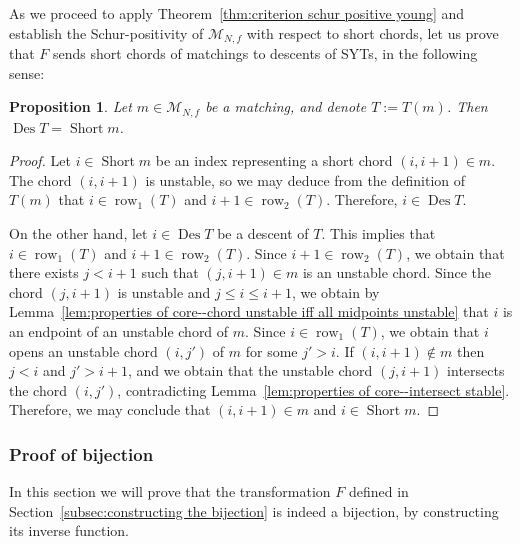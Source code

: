 \documentclass[11pt]{article}
\newtheorem{proposition}[theo]{Proposition}
\theoremstyle{definition}
\numberwithin{equation}{section}
\newcommand{\Des}{\operatorname{Des}}
\newcommand{\Short}{\operatorname{Short}}
\newcommand{\row}{\operatorname{row}}
\newcommand{\M}{\mathcal{M}}
\begin{document}
As we proceed to apply Theorem~\ref{thm:criterion schur positive young} and establish the Schur-positivity of $\M_{N,f}$ with respect to short chords, let us prove that $F$ sends short chords of matchings to descents of SYTs, in the following sense:

\begin{proposition}
\label{prop:F statistic preserving}
    Let $m \in \M_{N,f}$ be a matching, and denote $T := T(m)$. Then $\Des T = \Short m$.
\end{proposition}
\begin{proof}
    Let $i \in \Short m$ be an index representing a short chord $(i,i+1) \in m$. The chord $(i,i+1)$ is unstable, so we may deduce from the definition of $T(m)$ that $i \in \row_1(T)$ and $i+1 \in \row_2(T)$. Therefore, $i \in \Des T$.
    
    On the other hand, let $i \in \Des T$ be a descent of $T$. This implies that $i \in \row_1(T)$ and $i+1 \in \row_2(T)$. Since $i+1 \in \row_2(T)$, we obtain that there exists $j < i+1$ such that $(j,i+1) \in m$ is an unstable chord. Since the chord $(j,i+1)$ is unstable and $j \le i \le i+1$, we obtain by Lemma~\ref{lem:properties of core--chord unstable iff all midpoints unstable} that $i$ is an endpoint of an unstable chord of $m$. Since $i \in \row_1(T)$, we obtain that $i$ opens an unstable chord $(i,j')$ of $m$ for some $j'>i$.
    If $(i,i+1) \notin m$ then $j<i$ and $j' > i+1$, and we obtain that the unstable chord $(j,i+1)$ intersects the chord $(i,j')$, contradicting Lemma~\ref{lem:properties of core--intersect stable}. Therefore, we may conclude that $(i,i+1) \in m$ and $i \in \Short m$.
\end{proof}




\subsubsection{Proof of bijection}
\label{subsec:proof of bijection}

In this section we will prove that the transformation $F$ defined in Section~\ref{subsec:constructing the bijection} is indeed a bijection, by constructing its inverse function.
\end{document}
